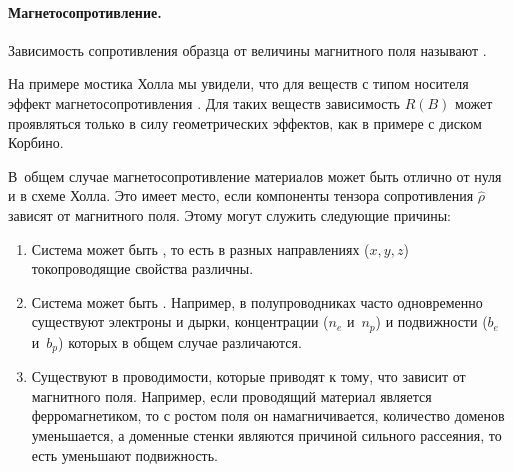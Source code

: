 \paragraph{Магнетосопротивление.}
Зависимость сопротивления образца от величины магнитного поля называют
.

На примере мостика Холла мы увидели, что для  веществ с
 типом носителя эффект магнетосопротивления
. Для таких веществ зависимость $R(B)$ может проявляться
только в силу геометрических эффектов, как в примере с диском Корбино.

В~общем случае магнетосопротивление материалов может быть отлично от нуля
и в схеме Холла. Это имеет место, если
 компоненты тензора сопротивления $\widehat{\rho}$
зависят от магнитного поля. Этому могут служить следующие причины:
\begin{enumerate}
    \item Система может быть , то есть в разных
направлениях ($x,y,z$) токопроводящие свойства различны.

\item Система может быть . Например, в
полупроводниках часто одновременно существуют электроны и дырки, концентрации
($n_e$ и~$n_p$) и подвижности ($b_e$ и~$b_p$) которых в общем случае
различаются.

\item Существуют  в проводимости, которые приводят
к тому, что  зависит от магнитного поля. Например, если
проводящий материал является ферромагнетиком, то с ростом поля он
намагничивается, количество доменов уменьшается, а доменные стенки являются
причиной сильного рассеяния, то есть уменьшают подвижность.
\end{enumerate}

